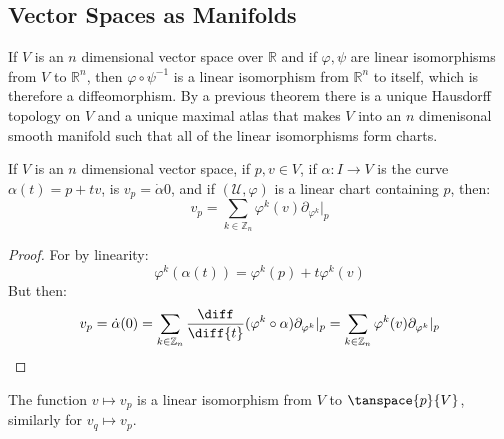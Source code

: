 \documentclass{article}                                                        %
\begin{document}
        \subsection{Vector Spaces as Manifolds}
            If $V$ is an $n$ dimensional vector space over $\mathbb{R}$ and if
            $\varphi,\psi$ are linear isomorphisms from $V$ to $\mathbb{R}^{n}$,
            then $\varphi\circ\psi^{\minus{1}}$ is a linear isomorphism from
            $\mathbb{R}^{n}$ to itself, which is therefore a diffeomorphism.
            By a previous theorem there is a unique Hausdorff topology on
            $V$ and a unique maximal atlas that makes $V$ into an $n$
            dimenisonal smooth manifold such that all of the linear isomorphisms
            form charts.
            \begin{theorem}
                If $V$ is an $n$ dimensional vector space, if $p,v\in{V}$, if
                $\alpha:I\rightarrow{V}$ is the curve $\alpha(t)=p+tv$, is
                $v_{p}=\dot{\alpha}{0}$, and if $(\mathcal{U},\varphi)$ is a
                linear chart containing $p$, then:
                \begin{equation}
                    v_{p}=\sum_{k\in\mathbb{Z}_{n}}
                        \varphi^{k}(v)\partial_{\varphi^{k}}|_{p}
                \end{equation}
            \end{theorem}
            \begin{proof}
                For by linearity:
                \begin{equation}
                    \varphi^{k}(\alpha(t))=\varphi^{k}(p)+t\varphi^{k}(v)
                \end{equation}
                But then:
                \begin{equation}
                    v_{p}=\dot{\alpha}(0)
                    =\sum_{k\in\mathbb{Z}_{n}}
                        \frac{\diff}{\diff{t}}(\varphi^{k}\circ\alpha)
                        \partial_{\varphi^{k}}|_{p}
                    =\sum_{k\in\mathbb{Z}_{n}}\varphi^{k}(v)
                        \partial_{\varphi^{k}}|_{p}
                \end{equation}
            \end{proof}
            The function $v\mapsto{v}_{p}$ is a linear isomorphism from $V$ to
            $\tanspace{p}{V}$, similarly for $v_{q}\mapsto{v}_{p}$.
\end{document}
